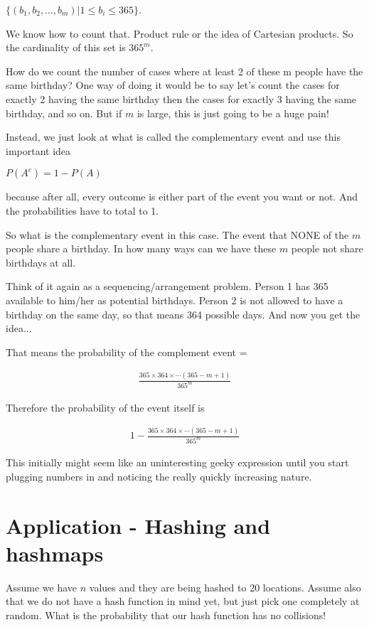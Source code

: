 \documentclass[12pt]{article}
\begin{document}
$\{(b_1, b_2, \ldots, b_m)| 1 \le b_i \le 365 \}$.

We know how to count that. Product rule or the idea of Cartesian products. So the cardinality of this set is $365^m$.

How do we count the number of cases where at least 2 of these m people have the same birthday?
One way of doing it would be to say let's count the cases for exactly 2 having the same birthday then the cases for exactly 3 having the same birthday, and so on. But if $m$ is large, this is just going to be a huge pain!

Instead, we just look at what is called the complementary event and use this important idea

$P(A^c) = 1 - P(A)$ 

because after all, every outcome is either part of the event you want or not. And the probabilities have to total to 1.

So what is the complementary event in this case. The event that NONE of the $m$ people share a birthday. In how many ways can we have these $m$ people not share birthdays at all.

Think of it again as a sequencing/arrangement problem. Person 1 has 365 available to him/her as potential birthdays. Person 2 is not allowed to have a birthday on the same day, so that means 364 possible days. And now you get the idea...

That means the probability of the complement event = 

\begin{align*}
\frac{365 \times 364 \times \cdots (365-m+1)}{365^m}
\end{align*}

Therefore the probability of the event itself is

\begin{align*}
1 - \frac{365 \times 364 \times \cdots (365-m+1)}{365^m}
\end{align*}

This initially might seem like an uninteresting geeky expression until you start plugging numbers in and noticing the really quickly increasing nature.

\section*{Application - Hashing and hashmaps}

Assume we have $n$ values and they are being hashed to 20 locations. Assume also that we do not have a hash function in mind yet, but just pick one completely at random. What is the probability that our hash function has no collisions!
\end{document}
